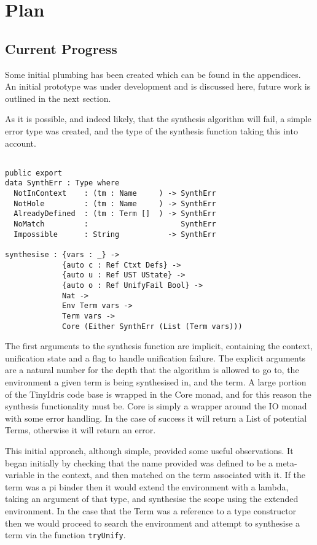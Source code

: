 \documentclass[a4paper]{article}
\begin{document}
\section{Plan}
\label{sec:org8b6763d}
\subsection{Current Progress}
\label{sec:org8963d86}
Some initial plumbing has been created which can be found in the appendices. An initial prototype was under development 
and is discussed here, future work is outlined in the next section. 

As it is possible, and indeed likely, that the synthesis algorithm will fail, a simple 
error type was created, and the type of the synthesis function taking this into account. 

\begin{center}
\begin{verbatim}

public export
data SynthErr : Type where
  NotInContext    : (tm : Name     ) -> SynthErr 
  NotHole         : (tm : Name     ) -> SynthErr
  AlreadyDefined  : (tm : Term []  ) -> SynthErr
  NoMatch         :                     SynthErr
  Impossible      : String           -> SynthErr

synthesise : {vars : _} -> 
			 {auto c : Ref Ctxt Defs} ->
			 {auto u : Ref UST UState} ->  
			 {auto o : Ref UnifyFail Bool} ->
			 Nat ->
			 Env Term vars -> 
			 Term vars ->
			 Core (Either SynthErr (List (Term vars)))

\end{verbatim}
\end{center}

The first arguments to the synthesis function are implicit, containing the context, unification state and a flag to handle unification failure. 
The explicit arguments are a natural number for the depth that the algorithm is allowed to go to,
the environment a given term is being synthesised in, and the term. A large portion of the TinyIdris code base is 
wrapped in the Core monad, and for this reason the synthesis functionality must be. Core is simply a wrapper around 
the IO monad with some error handling. In the case of success it will return a List of potential Terms, otherwise it will return an error.   

This initial approach, although simple, provided some useful observations. It began initially 
by checking that the name provided was defined to be a meta-variable in the context, and then matched on the term associated
with it. If the term was a pi binder then it would extend the environment with a lambda, taking an argument of that type, and synthesise the 
scope using the extended environment. In the case that the Term was a reference to a type constructor then we would proceed
to search the environment and attempt to synthesise a term via the function \texttt{tryUnify}. 
\end{document}

